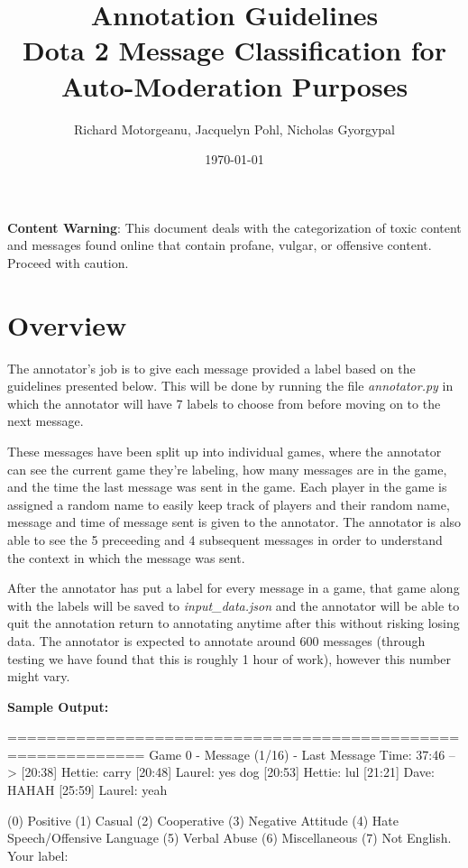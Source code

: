 \documentclass[11pt, letterpaper, notitlepage]{article}
\title{Annotation Guidelines \\ Dota 2 Message Classification for Auto-Moderation Purposes}
\author{Richard Motorgeanu, Jacquelyn Pohl, Nicholas Gyorgypal}
\date{\today}
\begin{document}
\maketitle


\vspace{8em}

\large
\textbf{Content Warning}: This document deals with the categorization of toxic content and messages found online that contain profane, vulgar, or offensive content. Proceed with caution.

\vspace{2em}

\newpage

\section[1]{Overview}

The annotator's job is to give each message provided a label based on the guidelines presented below.
This will be done by running the file \textit{annotator.py} in which the annotator will have 7 labels to choose from before moving on to the next message.

These messages have been split up into individual games, where the annotator can see the current game they're labeling, how many messages are in the game, and the time the last message was sent in the game.
Each player in the game is assigned a random name to easily keep track of players and their random name, message and time of message sent is given to the annotator.
The annotator is also able to see the 5 preceeding and 4 subsequent messages in order to understand the context in which the message was sent.

After the annotator has put a label for every message in a game, that game along with the labels will be saved to \textit{input\_data.json} and the annotator will be able to quit the annotation return to annotating anytime after this without risking losing data.
The annotator is expected to annotate around 600 messages (through testing we have found that this is roughly 1 hour of work), however this number might vary.

\vspace{2em}

\textbf{Sample Output:}
\begin{python}
============================================================
Game 0 - Message (1/16) - Last Message Time: 37:46
--> [20:38] Hettie: carry
    [20:48] Laurel: yes dog
    [20:53] Hettie: lul
    [21:21] Dave: HAHAH
    [25:59] Laurel: yeah 

(0) Positive (1) Casual (2) Cooperative (3) Negative Attitude (4) Hate Speech/Offensive Language (5) Verbal Abuse (6) Miscellaneous (7) Not English.
Your label: 
\end{python}
\end{document}
